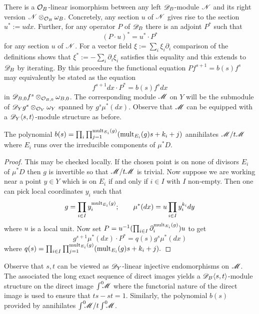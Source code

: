 There is a $\mathcal{O}_{B}$-linear isomorphism between any left $\mathscr{D}_{B}$-module $\mathscr{N}$ and its right version $ \mathscr{N} \otimes_{\mathcal{O}_{B}}\omega_{B}$.
Concretely, any section $u$ of $\mathscr{N}$ gives rise to the section $u^* := u dx$.
Further, for any operator $P$ of $\mathscr{D}_B$ there is an adjoint $P^*$ such that
$$(P\cdot u)^* =   u^* \cdot P^*$$
for any section $u$ of $\mathscr{N}$.
For a vector field $\xi := \sum_i\xi_i \partial_i$ comparison of the definitions shows that $\xi^* := -\sum_i\partial_i\xi_i$ satisfies this equality and this extends to $\mathscr{D}_B$ by iterating.
By this procedure the functional equation $P f^{s+1} = b(s) f^s$ may equivalently be stated as the equation
$$f^{s+1}dx \cdot P^* = b(s) f^s dx $$
in $\mathscr{D}_{B,0} f^s \otimes_{\mathcal{O}_{B,0}}\omega_{B,0}$.
The corresponding module $\mathscr{M}$ on $Y$ will be the submodule of $\mathscr{D}_{Y} g^s \otimes_{\mathcal{O}_Y}\omega_Y$ spanned by $g^s \mu^*(dx)$.
Observe that $\mathscr{M}$ can be equipped with a $\mathscr{D}_Y\langle s,t\rangle$-module structure as before.
\begin{lemma}\label{lem: UpstairsB}
  The polynomial $b(s) = \prod_{i} \prod_{j=1}^{\operatorname{mult}_{E_i}(g)} (\operatorname{mult}_{E_i}(g)s + k_i + j)$ annihilates $\mathscr{M} / t\mathscr{M}$ where $E_i$ runs over the irreducible components of $\mu^*D$.
\end{lemma}
\begin{proof}
  This may be checked locally.
  If the chosen point is on none of divisors $E_i$ of $\mu^*D$ then $g$ is invertible so that $\mathscr{M}/t\mathscr{M}$ is trivial.
  Now suppose we are working near a point $y\in Y$ which is on $E_i$ if and only if $i\in I$ with $I$ non-empty.
  Then one can pick local coordinates $y_i$ such that
  $$ g = \prod_{i\in I} y_i^{\operatorname{mult}_{E_i}(g)}; \qquad \mu^*(dx) =u \prod_{i\in I} y_i^{k_i}dy$$
  where $u$ is a local unit.
  Now set $P = u^{-1}(\prod_{i\in I}\partial_i^{\operatorname{mult}_{E_i}(g)})u$ to get
  $$g^{s+1} \mu^*(dx)\cdot P^* = q(s) g^s \mu^*(dx)$$
  where $q(s) = \prod_{i\in I}\prod_{j=1}^{\operatorname{mult}_{E_i}(g)} (\operatorname{mult}_{E_i}(g)s +  k_i + j ). $
\end{proof}
Observe that $s,t$ can be viewed as $\mathscr{D}_Y$-linear injective endomorphisms on $\mathscr{M}$.
The associated the long exact sequence of direct images yields a $\mathscr{D}_B\langle s,t\rangle$-module structure on the direct image $\int^0 \mkern -8mu \mathscr{M}$ where the functorial nature of the direct image is used to ensure that $ts -st = 1$.
Similarly, the polynomial $ b(s)$ provided by  annihilates $\int^0 \mkern -8mu\mathscr{M}/t\int^0 \mkern -8mu\mathscr{M}$.

